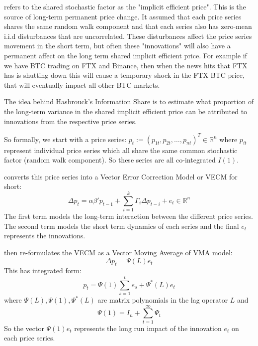 \documentclass[a4paper, oneside, notitlepage]{book}
\begin{document}
\cite{HASBROUCK1995} refers to the shared stochastic factor as the "implicit efficient price".
This is the source of long-term permanent price change.
It assumed that each price series shares the same random walk component and that each series also has zero-mean i.i.d disturbances that are uncorrelated. 
These disturbances affect the price series movement in the short term, but often these
"innovations" will also have a permanent affect on the long term shared implicit efficient price. For example if we have BTC trading on FTX and Binance, then when the news hits
that FTX has is shutting down this will cause a temporary shock in the FTX BTC price,
that will eventually impact all other BTC markets.

The idea behind Hasbrouck's Information Share is to estimate what proportion of the long-term variance in the shared implicit efficient price can be attributed to innovations from the respective price series.

So formally, we start with a price series: $p_{t} := (p_{1t}, p_{2t}, \dots, p_{nt})^T \in \mathbb{R}^n$ where $p_{it}$ represent
individual price series which all share the same common stochastic factor (random walk component). So these series are all co-integrated $I(1)$.

\cite{HASBROUCK1995} converts this price series into a Vector Error Correction Model or VECM for short:
\begin{equation}
    \Delta p_{t} = \alpha \beta' p_{t-1} + \sum_{i=1}^k \Gamma_{i} \Delta p_{t-i} + e_{t} \in \mathbb{R}^n
\end{equation}
The first term models the long-term interaction between the different price series. The second term models the short term dynamics of each series and the final $e_{t}$ represents the innovations.

\cite{HASBROUCK1995} then re-formulates the VECM as a Vector Moving Average of VMA model:
\begin{equation}
    \Delta p_{t} = \Psi(L)e_{t} \label{VMA}
\end{equation}
This has integrated form:
\begin{equation}
    p_{t} = \Psi(1) \sum_{s=1}^t e_{s} + \Psi^*(L)e_{t}
\end{equation}
where $\Psi(L), \Psi(1), \Psi^*(L)$ are matrix polynomials in the lag operator $L$ and
\begin{equation}
    \Psi(1) = I_{n} + \sum_{t=1}^\infty \Psi_{t} \label{Psi1}
\end{equation}
So the vector $\Psi(1)e_{t}$ represents the long run impact of the innovation $e_{t}$ on each price series.
\end{document}
